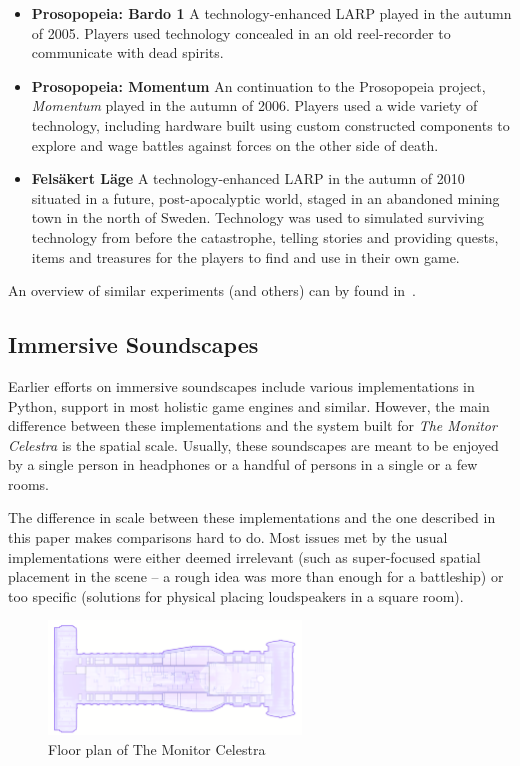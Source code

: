 \begin{itemize}
\item \textbf{Prosopopeia: Bardo 1} A technology-enhanced LARP played in the autumn of 2005. Players used technology concealed in an old reel-recorder to communicate with dead spirits.
\item \textbf{Prosopopeia: Momentum} An continuation to the Prosopopeia project, \emph{Momentum} played in the autumn of 2006. Players used a wide variety of technology, including hardware built using custom constructed components to explore and wage battles against forces on the other side of death. 
\item \textbf{Felsäkert Läge} A technology-enhanced LARP in the autumn of 2010 situated in a future, post-apocalyptic world, staged in an abandoned mining town in the north of Sweden. Technology was used to simulated surviving technology from before the catastrophe, telling stories and providing quests, items and treasures for the players to find and use in their own game.
\end{itemize}

An overview of similar experiments (and others) can by found in~\cite{nordiclarp}.

\subsection{Immersive Soundscapes}
Earlier efforts on immersive soundscapes include various implementations in Python, support in most holistic game engines and similar. However, the main difference between these implementations and the system built for \emph{The Monitor Celestra} is the spatial scale. Usually, these soundscapes are meant to be enjoyed by a single person in headphones or a handful of persons in a single or a few rooms. 

The difference in scale between these implementations and the one described in this paper makes comparisons hard to do. Most issues met by the usual implementations were either deemed irrelevant (such as super-focused spatial placement in the scene -- a rough idea was more than enough for a battleship) or too specific (solutions for physical placing loudspeakers in a square room). 

\begin{figure}[H]
  \centering
  \includegraphics[width=0.6\textwidth]{img/ship}
  \caption{Floor plan of The Monitor Celestra}
  \label{fig:celestra}
\end{figure}

